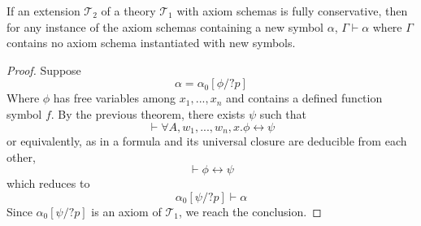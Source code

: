 \begin{thm}

If an extension $\mathcal{T}_2$ of a theory $\mathcal{T}_1$ with axiom schemas is fully conservative, then for any instance of the axiom schemas containing a new symbol $\alpha$, $\Gamma \vdash \alpha$ where $\Gamma$ contains no axiom schema instantiated with new symbols.

\end{thm}
\begin{proof}
Suppose
$$
\alpha = \alpha_0[\phi / ?p]
$$
Where $\phi$ has free variables among $x_1,...,x_n$ and contains a defined function symbol $f$. By the previous theorem, there exists $\psi$ such that
$$\vdash \forall A, w_1, ..., w_n, x. \phi \leftrightarrow \psi$$
or equivalently, as in a formula and its universal closure are deducible from each other,
$$\vdash \phi \leftrightarrow \psi$$
which reduces to
$$
\alpha_0[\psi / ?p] \vdash \alpha
$$
Since $\alpha_0[\psi / ?p]$ is an axiom of $\mathcal{T}_1$, we reach the conclusion.
\end{proof}

